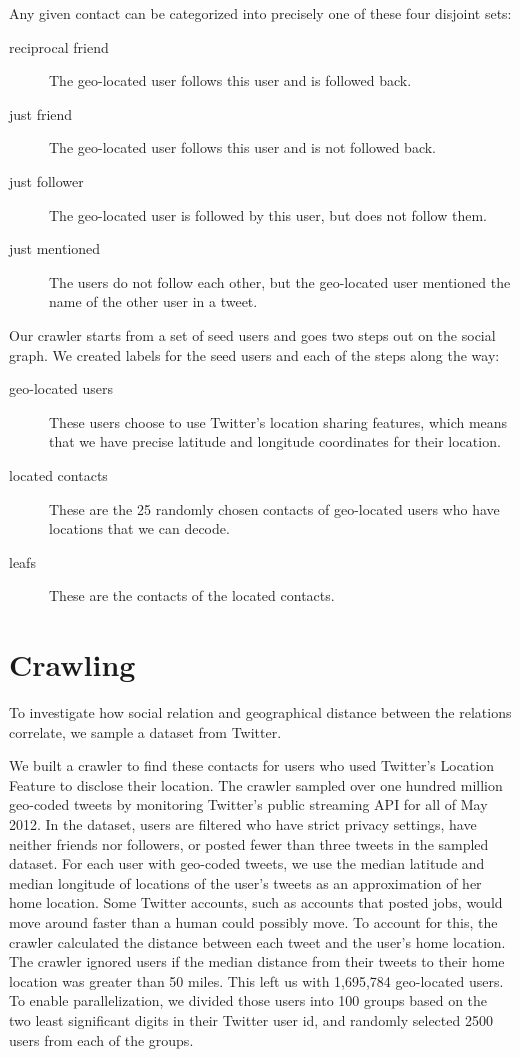 Any given contact can be categorized into precisely one of these four disjoint
sets:
\begin{description}
\item[reciprocal friend] The geo-located user follows this user and is followed
    back.
\item[just friend] The geo-located user follows this user and is not followed
    back.
\item[just follower] The geo-located user is followed by this user, but does
    not follow them.
\item[just mentioned] The users do not follow each other, but the geo-located
    user mentioned the name of the other user in a tweet.
\end{description}

Our crawler starts from a set of seed users and goes two steps out on the
social graph.
%
We created labels for the seed users and each of the steps along the way:

\begin{description}
\item[geo-located users] These users choose to use Twitter's location sharing
    features, which means that we have precise latitude and longitude
    coordinates for their location.
\item[located contacts] These are the 25 randomly chosen contacts of
    geo-located users who have locations that we can decode.
\item[leafs] These are the contacts of the located contacts.
\end{description}

\section{Crawling}
To investigate how social relation and geographical distance between the
relations correlate, we sample a dataset from Twitter.

We built a crawler to find these contacts for users who used Twitter's Location
Feature to disclose their location.
The crawler sampled over one hundred million geo-coded tweets by monitoring
Twitter's public streaming API for all of May 2012.
In the dataset, users are filtered who have strict privacy settings, have
neither friends nor followers, or posted fewer than three tweets in the sampled
dataset.
For each user with geo-coded tweets, we use the median latitude and median
longitude of locations of the user's tweets as an approximation of her home
location.
Some Twitter accounts, such as accounts that posted jobs, would
move around faster than a human could possibly move.
To account for this, the crawler calculated the distance between each tweet and
the user's home location.
The crawler ignored users if the median distance from their tweets to their
home location was greater than 50 miles.
This left us with 1,695,784 geo-located users.
To enable parallelization, we divided those users into 100 groups based on
the two least significant digits in their Twitter user id, and randomly selected
2500 users from each of the groups.

